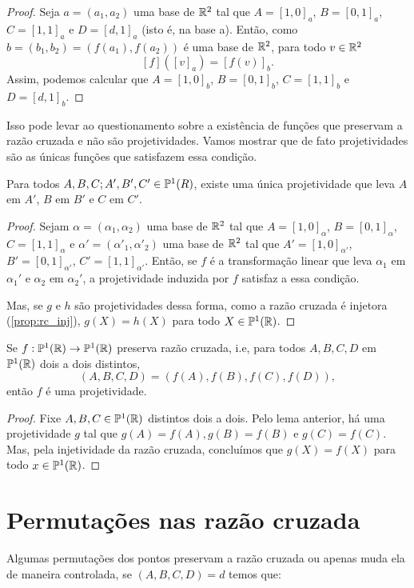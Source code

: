 \begin{proof}
Seja $a = (a_1,a_2)$ uma base de $\mathbb{R}^2$ tal que \(A = [1, 0]_a\), \(B = [0, 1]_a\), \(C = [1, 1]_a\) e \(D = [d, 1]_a\) (isto é, na base a). Então, como $ b = (b_1,b_2) = (f(a_1), f(a_2))$ é uma base de $\mathbb{R}^2$, para todo $v\in \mathbb{R}^2$ 
\[[f]([v]_a) = [f(v)]_b. \]
Assim, podemos calcular que 
\(A = [1, 0]_b\), \(B = [0, 1]_b\), \(C = [1, 1]_b\) e \(D = [d, 1]_b\).
\end{proof}

Isso pode levar ao questionamento sobre a existência de funções que preservam a razão cruzada e não são projetividades. Vamos mostrar que de fato projetividades são as únicas funções que satisfazem essa condição.

\begin{lem}
Para todos $A,B,C;A',B',C' \in \mathbb{P}^1(R)$, existe uma única projetividade que leva $A$ em $A'$, $B$ em $B'$ e $C$ em $C'$.
\end{lem}

\begin{proof}
Sejam $\alpha = (\alpha_1, \alpha_2)$ uma base de $\mathbb{R}^2$ tal que \(A = [1, 0]_\alpha\), \(B = [0, 1]_\alpha\), \(C = [1, 1]_\alpha\) e $\alpha' = (\alpha'_1, \alpha'_2)$ uma base de $\mathbb{R}^2$ tal que \(A' = [1, 0]_{\alpha'}\), \(B' = [0, 1]_{\alpha'}\), \(C' = [1, 1]_{\alpha'}\). Então, se $f$ é a transformação linear que leva $\alpha_1$ em $\alpha_1'$ e $\alpha_2$ em $\alpha_2'$, a projetividade induzida por $f$ satisfaz a essa condição.

Mas, se $g$ e $h$ são projetividades dessa forma, como a razão cruzada é injetora (\ref{prop:rc_inj}),
$g(X) = h(X)$ para todo \(X\in \mathbb{P}^1(\mathbb{R})\).
\end{proof}

\begin{thm}
Se $f:\mathbb{P}^1(\mathbb{R}) \to \mathbb{P}^1(\mathbb{R})$ preserva razão cruzada, i.e, para todos $A,B,C,D$ em $\mathbb{P}^1(\mathbb{R})$ dois a dois distintos, 
\[(A,B,C,D) = (f(A),f(B),f(C),f(D)),\]
então $f$ é uma projetividade.
\end{thm}

\begin{proof}
Fixe $A,B,C \in \mathbb{P}^1(\mathbb{R})$ distintos dois a dois.
Pelo lema anterior, há uma projetividade $g$ tal que $g(A) = f(A), g(B) = f(B)$ e $g(C) = f(C)$. Mas, pela injetividade da razão cruzada, concluímos que $g(X) = f(X)$ para todo $x\in \mathbb{P}^1(\mathbb{R})$.
\end{proof}

\section{Permutações nas razão cruzada}
Algumas permutações dos pontos preservam a razão cruzada ou apenas muda ela de maneira controlada, se $(A,B,C,D) = d$ temos que:

